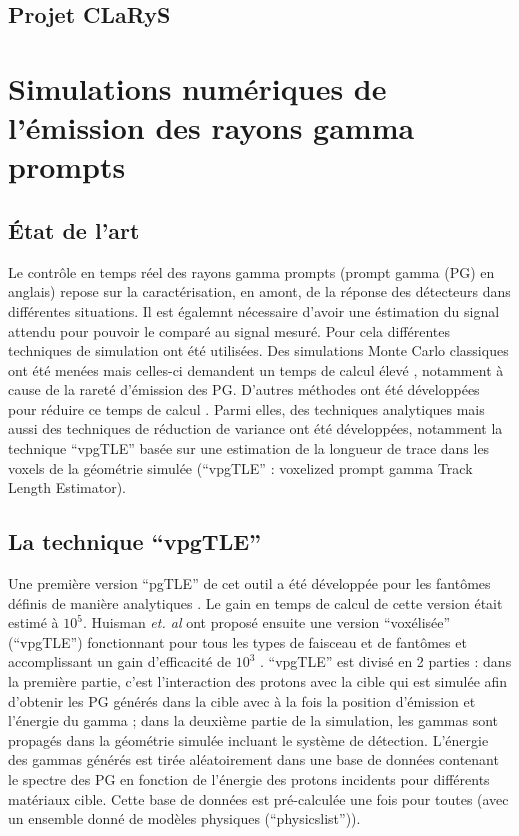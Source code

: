 \documentclass[11pt,a4paper,oldfontcommands]{memoir}
\begin{document}
\subsection{Projet CLaRyS}



\section{Simulations numériques de l'émission des rayons gamma prompts}

\subsection{\'Etat de l'art}

Le contrôle en temps réel des rayons gamma prompts (prompt gamma (PG) en anglais) repose sur la caractérisation, en amont, de la réponse des détecteurs dans différentes situations. Il est égalemnt nécessaire d'avoir une éstimation du signal attendu pour pouvoir le comparé au signal mesuré.  Pour cela différentes techniques de simulation ont été utilisées. Des simulations Monte Carlo classiques ont été menées mais celles-ci demandent un temps de calcul élevé \cite{KRIMMER201858}, notamment à cause de la rareté d'émission des PG. D'autres méthodes ont été développées pour réduire ce temps de calcul \cite{Qin_2017}. Parmi elles, des techniques analytiques \cite{Sterpin_2015} mais aussi des techniques de réduction de variance ont été développées, notamment la technique \enquote{vpgTLE} basée sur une estimation de la longueur de trace dans les voxels de la géométrie simulée (\enquote{vpgTLE} : voxelized prompt gamma Track Length Estimator).

\subsection{La technique \enquote{vpgTLE}}

Une première version \enquote{pgTLE} de cet outil a été développée pour les fantômes définis de manière analytiques \cite{El_Kanawati_2015}. Le gain en temps de calcul de cette version était estimé à $10^5$. Huisman \textit{et. al} ont proposé ensuite une version \enquote{voxélisée} (\enquote{vpgTLE}) fonctionnant pour tous les types de faisceau et de fantômes et accomplissant un gain d'efficacité de $10^3$ \cite{Huisman_2016}. \enquote{vpgTLE} est divisé en 2 parties : dans la première partie, c'est l'interaction des protons avec la cible qui est simulée afin d'obtenir les PG générés dans la cible avec à la fois la position d'émission et l'énergie du gamma  ; dans la deuxième partie de la simulation, les gammas sont propagés dans la géométrie simulée incluant le système de détection. L'énergie des gammas générés est tirée aléatoirement dans une base de données contenant le spectre des PG en fonction de l'énergie des protons incidents pour différents matériaux cible. Cette base de données est pré-calculée une fois pour toutes (avec un ensemble donné de modèles physiques (\enquote{physicslist})).
\end{document}
